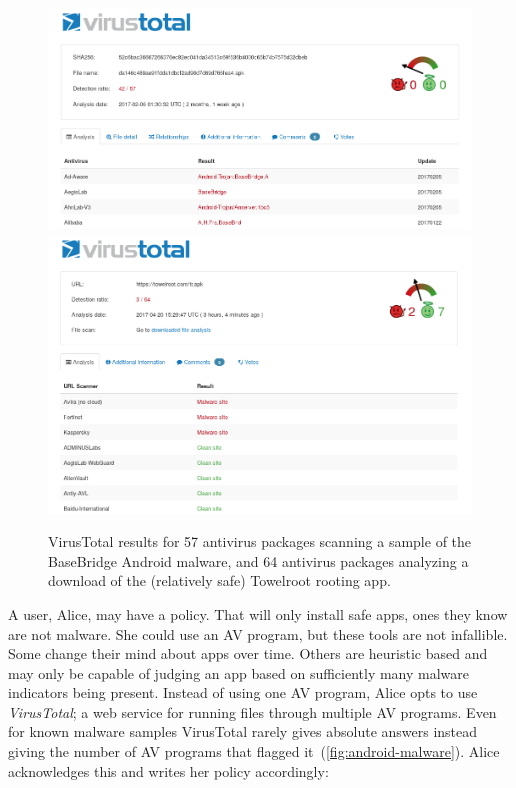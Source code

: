 \documentclass[thesis.tex]{subfiles}
\begin{document}
\begin{figure}
  \centering
  \includegraphics[width=0.99\linewidth]{figures/android-malware.png}
  \includegraphics[width=0.99\linewidth]{figures/towelroot.png}
  \caption[VirusTotal results for two Android apps.]{VirusTotal results for 57
    antivirus packages scanning a sample of the BaseBridge Android malware, and 64
    antivirus packages analyzing a download of the (relatively safe) Towelroot
    rooting app.}
  \label{fig:android-malware}
\end{figure}

A user, Alice, may have a policy. That will only install safe apps, ones they
know are not malware. She could use an \ac{AV} program, but these tools are not
infallible. Some change their mind about apps over time. Others are heuristic
based and may only be capable of judging an app based on sufficiently many
malware indicators being present. Instead of using one \ac{AV} program, Alice
opts to use \emph{VirusTotal}; a web service for running files through multiple
\ac{AV} programs. Even for known malware samples VirusTotal rarely gives
absolute answers instead giving the number of \ac{AV} programs that flagged
it~(\autoref{fig:android-malware}). Alice acknowledges this and writes her
policy accordingly:
\end{document}
